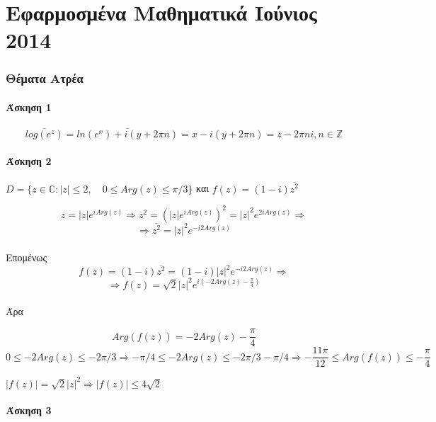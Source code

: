 \documentclass[12pt]{article}
\begin{document}
\newpage \part{Εφαρμοσμένα Μαθηματικά Ιούνιος 2014}
\author{}


\maketitle
\newpage
 

 \section{Θέματα Ατρέα}
 \subsection{Άσκηση 1}
$$
\overline{log(e^z)}=\overline{ln(e^x)+i(y+2\pi n)}=x-i(y+2\pi n)=\overline{z}-2\pi n i ,n\in \mathbb{Z}
$$
 \subsection{Άσκηση 2}
$
D = \{z \in \mathbb{C}:|z|\leqslant2 ,\quad 0 \leqslant Arg(z) \leqslant
 \pi /3 \}
$ και $ f(z) = (1-i)\overline{z^2}$

$$
z=|z|e^{iArg(z)} \Rightarrow z^2=(|z|e^{iArg(z)})^2=
|z|^2e^{2iArg(z)}\Rightarrow
$$
$$
\Rightarrow \overline{z^2}=|z|^2e^{-i2Arg(z)}
$$
\\Επομένως
\\
$$
f(z) = (1-i)\overline{z^2}=
(1-i)|z|^2e^{-i2Arg(z)} \Rightarrow
$$
$$
\Rightarrow f(z)=\sqrt{2}|z|^2e^{i(-2Arg(z)-\frac{\pi}{4})}
$$
\\Άρα

$$
Arg(f(z))=-2Arg(z)-\frac{\pi}{4}
$$
$$
0 \leqslant -2Arg(z) \leqslant
 -2\pi /3 \Rightarrow 
-\pi / 4 \leqslant -2Arg(z) \leqslant
 -2\pi /3  -\pi / 4\Rightarrow \boxed{
  -\frac{11\pi}{12}
 \leqslant Arg(f(z)) \leqslant -\frac{\pi}{4}
}$$

$
|f(z)|=\sqrt{2}|z|^2 \Rightarrow 
\boxed {|f(z)| \leqslant 4\sqrt{2}}
$
\newpage
 \subsection{Άσκηση 3}
\end{document}
